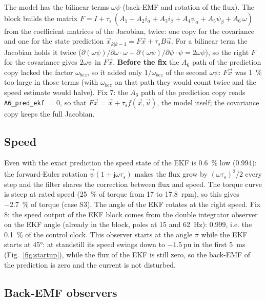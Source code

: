 \documentclass[10pt,a4paper]{scrartcl}
\newcommand{\tspu}{\tau_s}
\newcommand{\jj}{\mathrm{j}}
\newcommand{\pu}{\,\mathrm{pu}}
\newcommand{\code}[1]{\texttt{#1}}
\newcommand{\wb}{\omega_{bez}}
\begin{document}
\begin{onehalfspace}
The model has the bilinear terms $\omega\psi$ (back-EMF and rotation of the flux). The block builds the matrix $F = I + \tspu\,(A_1 + A_2 i_\alpha + A_3 i_\beta + A_4\psi_\alpha + A_5\psi_\beta + A_6\,\omega)$ from the coefficient matrices of the Jacobian, twice: one copy for the covariance and one for the state prediction $\vec x_{k|k-1} = F\vec x + \tspu B\vec u$. For a bilinear term the Jacobian holds it twice ($\partial(\omega\psi)/\partial\omega\cdot\omega + \partial(\omega\psi)/\partial\psi\cdot\psi = 2\omega\psi$), so the right $F$ for the covariance gives $2\omega\psi$ in $F\vec x$. \textbf{Before the fix} the $A_6$ path of the prediction copy lacked the factor $\wb$, so it added only $1/\wb$ of the second $\omega\psi$: $F\vec x$ was \SI{1}{\percent} too large in those terms (with $\wb$ on that path they would count twice and the speed estimate would halve). Fix 7: the $A_6$ path of the prediction copy reads \code{A6\_pred\_ekf} $= 0$, so that $F\vec x = \vec x + \tspu f(\vec x, \vec u)$, the model itself; the covariance copy keeps the full Jacobian.

\subsection{Speed}
\label{sec:speed}

Even with the exact prediction the speed state of the EKF is \SI{0.6}{\percent} low (0.994): the forward-Euler rotation $\vec\psi(1 + \jj\omega\tspu)$ makes the flux grow by $(\omega\tspu)^2/2$ every step and the filter shares the correction between flux and speed. The torque curve is steep at rated speed (\SI{+25}{\percent} of torque from \SI{17}{} to \SI{17.8}{rpm}), so this gives \SI{-2.7}{\percent} of torque (case S3). The angle of the EKF rotates at the right speed. Fix 8: the speed output of the EKF block comes from the double integrator observer on the EKF angle (already in the block, poles at \SI{15}{} and \SI{62}{Hz}): 0.999, i.e. the \SI{0.1}{\percent} of the control clock. This observer starts at the angle $\pi$ while the EKF starts at \ang{45}: at standstill its speed swings down to $-1.5\pu$ in the first \SI{5}{ms} (Fig.~\ref{fig:startup}), while the flux of the EKF is still zero, so the back-EMF of the prediction is zero and the current is not disturbed.

\subsection{Back-EMF observers}


\end{onehalfspace}
\end{document}
